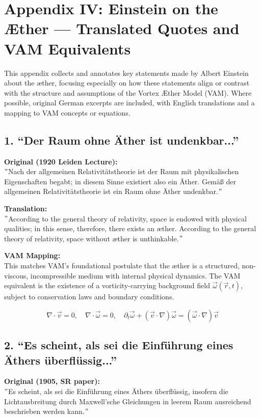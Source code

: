 \documentclass[preprint]{revtex4-2}
\renewcommand{\grqq}{``}
\begin{document}
\section*{Appendix IV: Einstein on the Æther — Translated Quotes and VAM Equivalents}
\label{appendix:einstein}

    This appendix collects and annotates key statements made by Albert Einstein about the æther, focusing especially on how these statements align or contrast with the structure and assumptions of the Vortex Æther Model (VAM). Where possible, original German excerpts are included, with English translations and a mapping to VAM concepts or equations.

    \subsection*{1. \grqq Der Raum ohne Äther ist undenkbar...\textquotedblright}
    \textbf{Original (1920 Leiden Lecture):} \\
    \("\)Nach der allgemeinen Relativitätstheorie ist der Raum mit physikalischen Eigenschaften begabt; in diesem Sinne existiert also ein Äther. Gemäß der allgemeinen Relativitätstheorie ist ein Raum ohne Äther undenkbar.\("\)

    \textbf{Translation:} \\
    \("\)According to the general theory of relativity, space is endowed with physical qualities; in this sense, therefore, there exists an æther. According to the general theory of relativity, space without æther is unthinkable.\("\)

    \textbf{VAM Mapping:} \\
    This matches VAM's foundational postulate that the æther is a structured, non-viscous, incompressible medium with internal physical dynamics. The VAM equivalent is the existence of a vorticity-carrying background field \( \vec{\omega}(\vec{r}, t) \), subject to conservation laws and boundary conditions.

    \[
    \nabla \cdot \vec{v} = 0, \quad \nabla \cdot \vec{\omega} = 0, \quad \partial_t \vec{\omega} + (\vec{v} \cdot \nabla) \vec{\omega} = (\vec{\omega} \cdot \nabla) \vec{v}
    \]

    \subsection*{2. \grqq Es scheint, als sei die Einführung eines Äthers überflüssig...\textquotedblright}
    \textbf{Original (1905, SR paper):} \\
    \("\)Es scheint, als sei die Einführung eines Äthers überflüssig, insofern die Lichtausbreitung durch Maxwell'sche Gleichungen in leerem Raum ausreichend beschrieben werden kann.\("\)
\end{document}
